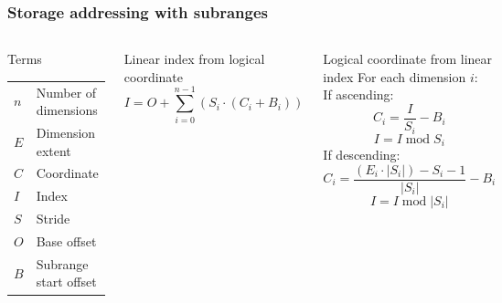 \documentclass{beamer}
\makeatletter
\newenvironment{conditions}
  {\par\vspace{\abovedisplayskip}\noindent\begin{tabular}{>{$}l<{$} @{${}={}$} l}}
  {\end{tabular}\par\vspace{\belowdisplayskip}}
\makeatother
\begin{document}
\begin{frame}
  \frametitle{Storage addressing with subranges}
  \begin{columns}
    \begin{block}{Terms}
    \begin{conditions}
      n & Number of dimensions \\
      E & Dimension extent \\
      C & Coordinate \\
      I & Index \\
      S & Stride \\
      O & Base offset \\
      B & Subrange start offset \\
    \end{conditions}
    \end{block}
    \begin{block}{Linear index from logical coordinate}
    \begin{equation*}
      I = O + \sum\limits_{i=0}^{n-1} (S_i \cdot (C_i + B_i))
    \end{equation*}
    \end{block}
    \begin{block}{Logical coordinate from linear index}
      For each dimension $i$:\\ \noindent
      If ascending:
      \begin{equation*}
        C_i = \frac{I}{S_i} - B_i
      \end{equation*}
      \begin{equation*}
        I = I \operatorname{mod} S_i
      \end{equation*}
      If descending:
      \begin{equation*}
        C_i = \frac{(E_i \cdot \lvert S_i \rvert) - S_i - 1}{\lvert S_i \rvert} - B_i
      \end{equation*}
      \begin{equation*}
        I = I \operatorname{mod} \lvert S_i \rvert
      \end{equation*}
    \end{block}
  \end{columns}
\end{frame}
\end{document}
